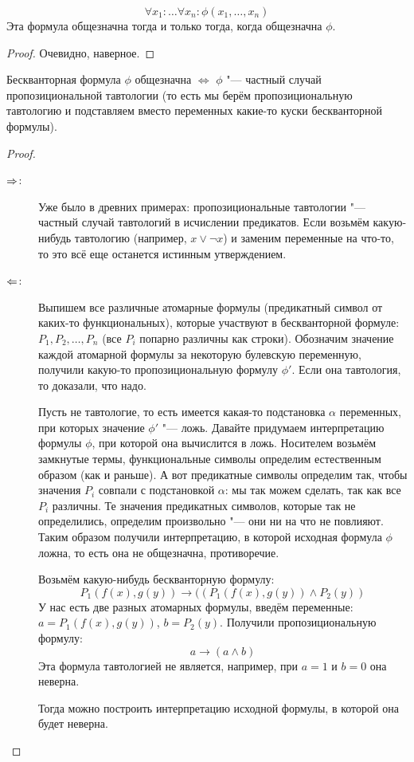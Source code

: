 \begin{assertion}
	\[
		\forall x_1 \colon \dots \forall x_n \colon \phi(x_1, \dots, x_n)
	\]
	Эта формула общезначна тогда и только тогда, когда общезначна $\phi$.
\end{assertion}
\begin{proof}
	Очевидно, наверное.
\end{proof}

\begin{theorem}
	Бескванторная формула $\phi$ общезначна $\iff$ $\phi$ "--- частный случай
	пропозициональной тавтологии (то есть мы берём пропозициональную тавтологию
	и подставляем вместо переменных какие-то куски бескванторной формулы).
\end{theorem}
\begin{proof}
	\begin{description}
		\item[$\Rightarrow$:]
			Уже было в древних примерах: пропозициональные тавтологии "--- частный случай тавтологий в исчислении предикатов.
			Если возьмём какую-нибудь тавтологию (например, $x \lor \lnot x$) и заменим переменные на что-то,
			то это всё еще останется истинным утверждением.
		\item[$\Leftarrow$:]
			Выпишем все различные атомарные формулы (предикатный символ от каких-то функциональных),
			которые участвуют в бескванторной формуле: $P_1, P_2, \dots, P_n$ (все $P_i$ попарно различны как строки).
			Обозначим значение каждой атомарной формулы за некоторую булевскую переменную, получили
			какую-то пропозициональную формулу $\phi'$.
			Если она тавтология, то доказали, что надо.

			Пусть не тавтологие, то есть имеется какая-то подстановка $\alpha$ переменных, при которых
			значение $\phi'$ "--- ложь.
			Давайте придумаем интерпретацию формулы $\phi$, при которой она вычислится в ложь.
			Носителем возьмём замкнутые термы, функциональные символы определим естественным образом
			(как и раньше).
			А вот предикатные символы определим так, чтобы значения $P_i$ совпали с подстановкой
			$\alpha$: мы так можем сделать, так как все $P_i$ различны.
			Те значения предикатных символов, которые так не определились, определим произвольно "--- они ни на что не повлияют.
			Таким образом получили интерпретацию, в которой исходная формула $\phi$ ложна, то есть она не общезначна, противоречие.

			\begin{exmp}
				Возьмём какую-нибудь бескванторную формулу:
				\[ P_1(f(x), g(y)) \to ((P_1(f(x), g(y)) \land P_2(y)) \]
				У нас есть две разных атомарных формулы, введём переменные: $a=P_1(f(x), g(y))$, $b=P_2(y)$.
				Получили пропозициональную формулу:
				\[ a \to (a \land b) \]
				Эта формула тавтологией не является, например, при $a=1$ и $b=0$ она неверна.

				Тогда можно построить интерпретацию исходной формулы, в которой она будет неверна.
			\end{exmp}
	\end{description}
\end{proof}

